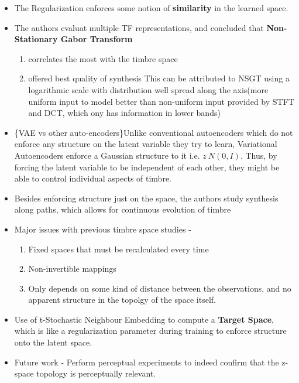 \documentclass[11pt]{article}
\providecommand{\tightlist}{%
      \setlength{\itemsep}{0pt}\setlength{\parskip}{0pt}}
\begin{document}
\begin{itemize}
\tightlist
\item
  The Regularization enforces some notion of \textbf{similarity} in the
  learned space.
\item
  The authors evaluat multiple TF representations, and concluded that
  \textbf{Non-Stationary Gabor Transform}

  \begin{enumerate}
  \def\labelenumi{\arabic{enumi}.}
  \tightlist
  \item
    correlates the most with the timbre space
  \item
    offered best quality of synthesis This can be attributed to NSGT
    using a logarithmic scale with distribution well spread along the
    axis(more uniform input to model better than non-uniform input
    provided by STFT and DCT, which ony has information in lower bands)
  \end{enumerate}
\item
  \{VAE vs other auto-encoders\}Unlike conventional autoencoders which
  do not enforce any structure on the latent variable they try to learn,
  Variational Autoencoders enforce a Gaussian structure to it i.e.
  \(z ~ N(0,I)\). Thus, by forcing the latent variable to be independent
  of each other, they might be able to control individual aspects of
  timbre.
\item
  Besides enforcing structure just on the space, the authors study
  synthesis along paths, which allows for continuous evolution of timbre
\end{itemize}

    \begin{itemize}
\item
  Major issues with previous timbre space studies -

  \begin{enumerate}
  \def\labelenumi{\arabic{enumi}.}
  \tightlist
  \item
    Fixed spaces that must be recalculated every time
  \item
    Non-invertible mappings
  \item
    Only depends on some kind of distance between the observations, and
    no apparent structure in the topolgy of the space itself.
  \end{enumerate}
\item
  Use of t-Stochastic Neighbour Embedding to compute a \textbf{Target
  Space}, which is like a regularization parameter during training to
  enforce structure onto the latent space.
\item
  Future work - Perform perceptual experiments to indeed confirm that
  the z-space topology is perceptually relevant.
\end{itemize}
\end{document}
